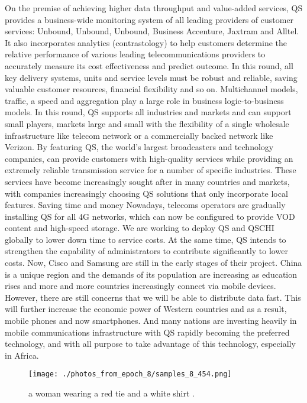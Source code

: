 \documentclass{article}%
\begin{document}
On the premise of achieving higher data throughput and value{-}added services, QS provides a business{-}wide monitoring system of all leading providers of customer services: Unbound, Unbound, Unbound, Business Accenture, Jaxtram and Alltel. It also incorporates analytics (contrastology) to help customers determine the relative performance of various leading telecommunications providers to accurately measure its cost effectiveness and predict outcome.\newline%
In this round, all key delivery systems, units and service levels must be robust and reliable, saving valuable customer resources, financial flexibility and so on.\newline%
Multichannel models, traffic, a speed and aggregation play a large role in business logic{-}to{-}business models. In this round, QS supports all industries and markets and can support small players, markets large and small with the flexibility of a single wholesale infrastructure like telecom network or a commercially backed network like Verizon.\newline%
By featuring QS, the world's largest broadcasters and technology companies, can provide customers with high{-}quality services while providing an extremely reliable transmission service for a number of specific industries. These services have become increasingly sought after in many countries and markets, with companies increasingly choosing QS solutions that only incorporate local features.\newline%
Saving time and money\newline%
Nowadays, telecoms operators are gradually installing QS for all 4G networks, which can now be configured to provide VOD content and high{-}speed storage.\newline%
We are working to deploy QS and QSCHI globally to lower down time to service costs. At the same time, QS intends to strengthen the capability of administrators to contribute significantly to lower costs. Now, Cisco and Samsung are still in the early stages of their project.\newline%
China is a unique region and the demands of its population are increasing as education rises and more and more countries increasingly connect via mobile devices. However, there are still concerns that we will be able to distribute data fast. This will further increase the economic power of Western countries and as a result, mobile phones and now smartphones. And many nations are investing heavily in mobile communications infrastructure with QS rapidly becoming the preferred technology, and with all purpose to take advantage of this technology, especially in Africa.\newline%

%


\begin{figure}[h!]%
\centering%
\texttt{[image: ./photos\_from\_epoch\_8/samples\_8\_454.png]}%
\caption{a woman wearing a red tie and a white shirt .}%
\end{figure}

%
\end{document}

